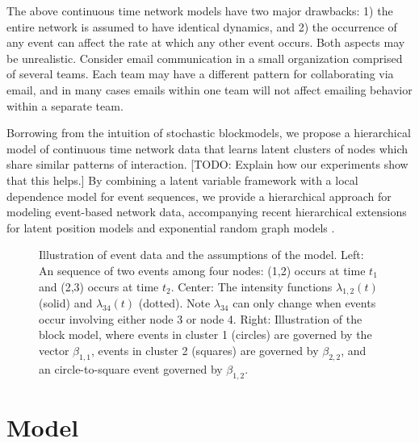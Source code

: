 \documentclass{article}
\begin{document}
The above continuous time network models have two major drawbacks: 1) the entire network is assumed to have identical dynamics, and 2) the occurrence of any event can affect the rate at which any other event occurs.  Both aspects may be unrealistic.  Consider email communication in a small organization comprised of several teams.  Each team may have a different pattern for collaborating via email, and in many cases emails within one team will not affect emailing behavior within a separate team.

Borrowing from the intuition of stochastic blockmodels, we propose a hierarchical model of continuous time network data that learns latent clusters of nodes which share similar patterns of interaction.  [TODO: Explain how our experiments show that this helps.]  By combining a latent variable framework with a local dependence model for event sequences, we provide a hierarchical approach for modeling event-based network data, accompanying recent hierarchical extensions for latent position models \cite{Handcock2007} and exponential random graph models \cite{Schweinberger2011}.
\begin{figure}
\center
 \def\svgwidth{5.5in}
  
\caption{Illustration of event data and the assumptions of the model.  Left: An sequence of two events among four nodes: (1,2) occurs at time $t_1$ and (2,3) occurs at time $t_2$.  Center: The intensity functions $\lambda_{1,2}(t)$ (solid) and $\lambda_{34}(t)$ (dotted).  Note $\lambda_{34}$ can only change when events occur involving either node 3 or node 4.  Right: Illustration of the block model, where events in cluster 1 (circles) are governed by the vector $\beta_{1,1}$, events in cluster 2 (squares) are governed by $\beta_{2,2}$, and an circle-to-square event governed by $\beta_{1,2}$.}
\label{fig:example}
\end{figure}  
\section{Model}
\end{document}
